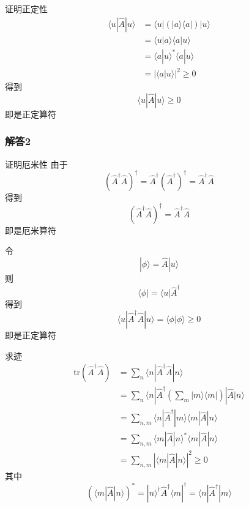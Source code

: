 证明正定性
\begin{equation}
    \begin{aligned}
        \langle u|\hat{A}|u\rangle &=\langle u|\left( |a\rangle \langle a| \right) |u\rangle 
\\
&=\langle u|a\rangle \langle a|u\rangle 
\\
&=\langle a|u\rangle ^*\langle a|u\rangle 
\\
&=\left| \langle a|u\rangle \right|^2\geqslant 0
    \end{aligned}
\end{equation}
得到
\begin{equation}
    \langle u|\hat{A}|u\rangle \geqslant 0
\end{equation}
即是正定算符

\subsubsection{解答2}
证明厄米性
由于
\begin{equation}
    \left( \hat{A}^{\dagger}\hat{A} \right) ^{\dagger}=\hat{A}^{\dagger}\left( \hat{A}^{\dagger} \right) ^{\dagger}=\hat{A}^{\dagger}\hat{A}
\end{equation}
得到
\begin{equation}
    \left( \hat{A}^{\dagger}\hat{A} \right) ^{\dagger}=\hat{A}^{\dagger}\hat{A}
\end{equation}
即是厄米算符

令
\begin{equation}
    |\phi \rangle =\hat{A}|u\rangle 
\end{equation}
则
\begin{equation}
    \langle \phi |=\langle u|\hat{A}^{\dagger}
\end{equation}
得到
\begin{equation}
    \langle u|\hat{A}^{\dagger}\hat{A}|u\rangle =\langle \phi |\phi \rangle \geqslant 0
\end{equation}
即是正定算符

求迹
\begin{equation}
    \begin{aligned}
        \mathrm{tr}\left( \hat{A}^{\dagger}\hat{A} \right) &=\sum_n{\langle n|\hat{A}^{\dagger}\hat{A}|n\rangle}
\\
&=\sum_n{\langle n|\hat{A}^{\dagger}\left( \sum_m{|m\rangle \langle m|} \right) |\hat{A}|n\rangle}
\\
&=\sum_{n,m}{\langle n|\hat{A}^{\dagger}|m\rangle \langle m|\hat{A}|n\rangle}
\\
&=\sum_{n,m}{\langle m|\hat{A}|n\rangle ^*\langle m|\hat{A}|n\rangle}
\\
&=\sum_{n,m}{\left| \langle m|\hat{A}|n\rangle \right|^2}\geqslant 0
    \end{aligned}
\end{equation}
其中
\begin{equation}
    \left( \langle m|\hat{A}|n\rangle \right) ^*=|n\rangle ^{\dagger}\hat{A}^{\dagger}\langle m|^{\dagger}=\langle n|\hat{A}^{\dagger}|m\rangle 
\end{equation}

